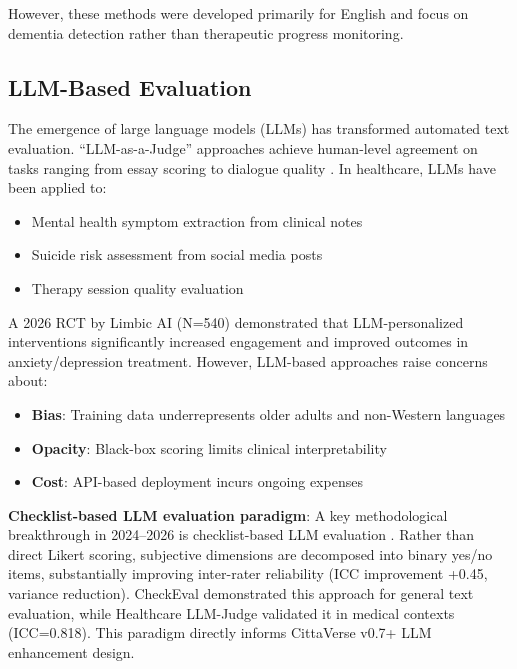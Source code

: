 \documentclass[11pt]{article}
\begin{document}
However, these methods were developed primarily for English and focus on dementia detection rather than therapeutic progress monitoring.

\subsection{LLM-Based Evaluation}

The emergence of large language models (LLMs) has transformed automated text evaluation. ``LLM-as-a-Judge'' approaches achieve human-level agreement on tasks ranging from essay scoring \citep{zheng2025} to dialogue quality \citep{liu2025}. In healthcare, LLMs have been applied to:
\begin{itemize}
    \item Mental health symptom extraction from clinical notes \citep{chen2025}
    \item Suicide risk assessment from social media posts \citep{wang2025}
    \item Therapy session quality evaluation \citep{goldberg2025}
\end{itemize}

A 2026 RCT by Limbic AI \citep{limbic2026} (N=540) demonstrated that LLM-personalized interventions significantly increased engagement and improved outcomes in anxiety/depression treatment. However, LLM-based approaches raise concerns about:
\begin{itemize}
    \item \textbf{Bias}: Training data underrepresents older adults and non-Western languages \citep{bender2021}
    \item \textbf{Opacity}: Black-box scoring limits clinical interpretability
    \item \textbf{Cost}: API-based deployment incurs ongoing expenses
\end{itemize}

\textbf{Checklist-based LLM evaluation paradigm}: A key methodological breakthrough in 2024--2026 is checklist-based LLM evaluation \citep{checkeval2024,autochecklist2026,healthcare_llm_judge2025}. Rather than direct Likert scoring, subjective dimensions are decomposed into binary yes/no items, substantially improving inter-rater reliability (ICC improvement +0.45, variance reduction). CheckEval \citep{checkeval2024} demonstrated this approach for general text evaluation, while Healthcare LLM-Judge \citep{healthcare_llm_judge2025} validated it in medical contexts (ICC=0.818). This paradigm directly informs CittaVerse v0.7+ LLM enhancement design.
\end{document}
